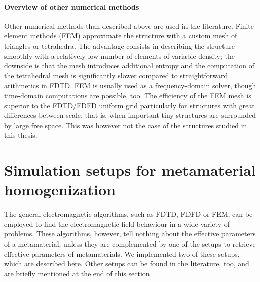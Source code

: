 \paragraph{Overview of other numerical methods} %
Other numerical methods than described above are used in the literature.
Finite-element methods (FEM) approximate the structure with a custom mesh of triangles or tetrahedra. The advantage consists in describing the structure smoothly with a relatively low number of elements of variable density; the downside is that the mesh introduces additional entropy and the computation of the tetrahedral mesh is significantly slower compared to straightforward arithmetics in FDTD. FEM is usually used as a frequency-domain solver, though time-domain computations are possible, too. The efficiency of the FEM mesh is superior to the FDTD/FDFD uniform grid particularly for structures with great differences between scale, that is, when important tiny structures are surrounded by large free space. This was however not the case of the structures studied in this thesis.



\section{Simulation setups for metamaterial homogenization} %
The general electromagnetic algorithms, such as FDTD, FDFD or FEM, can be employed to find the electromagnetic field behaviour in a wide variety of problems. These algorithms, however, tell nothing about the effective parameters of a metamaterial, unless they are complemented by one of the setups to retrieve effective parameters of metamaterials. We implemented two of these setups, which are described here. Other setups can be found in the literature, too, and are briefly mentioned at the end of this section.

